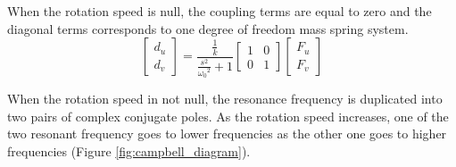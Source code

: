 \documentclass{ISMA_USD2020}
\begin{document}
When the rotation speed is null, the coupling terms are equal to zero and the diagonal terms corresponds to one degree of freedom mass spring system.
\begin{equation}
\label{eq:coupled_plant_no_rot}
\begin{bmatrix} d_u \\ d_v \end{bmatrix} =
\frac{\frac{1}{k}}{\frac{s^2}{{\omega_0}^2} + 1}
\begin{bmatrix}
  1 & 0 \\
  0 & 1
\end{bmatrix}
\begin{bmatrix} F_u \\ F_v \end{bmatrix}
\end{equation}

When the rotation speed in not null, the resonance frequency is duplicated into two pairs of complex conjugate poles.
As the rotation speed increases, one of the two resonant frequency goes to lower frequencies as the other one goes to higher frequencies (Figure \ref{fig:campbell_diagram}).
\end{document}
